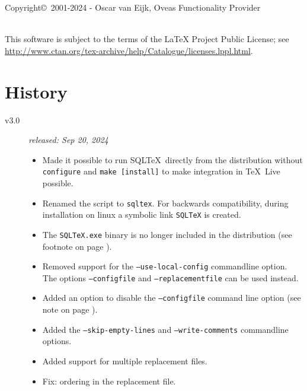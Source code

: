 \documentclass{article}
\begin{document}
\vspace{3mm}

\noindent Copyright\copyright\ 2001-2024 - Oscar van Eijk, Oveas Functionality Provider

\noindent\hrulefill \\

\noindent This software is subject to the terms of the LaTeX Project Public License; 
see \url{http://www.ctan.org/tex-archive/help/Catalogue/licenses.lppl.html}.

\section{History}

\begin{description}
\item[v3.0] \textit{released: Sep 20, 2024}
\begin{itemize}
\item Made it possible to run SQL\TeX\ directly from the distribution without \texttt{configure} and \texttt{make [install]} to make integration in \TeX\ Live possible.
\item Renamed the script to \texttt{sqltex}. For backwards compatibility, during installation on linux a symbolic link \texttt{SQLTeX} is created.
\item The \texttt{SQLTeX.exe} binary is no longer included in the distribution (see footnote  on page \pageref{winexe}).
\item Removed support for the \texttt{--use-local-config} commandline option. The options \texttt{--configfile} and \texttt{--replacementfile} can be used instead.
\item Added an option to disable the \texttt{--configfile} command line option (see note on page \pageref{cfg:disable}).
\item Added the \texttt{--skip-empty-lines} and \texttt{--write-comments} commandline options.
\item Added support for multiple replacement files.
\item Fix: ordering in the replacement file.
\end{itemize}


\end{description}
\end{document}

